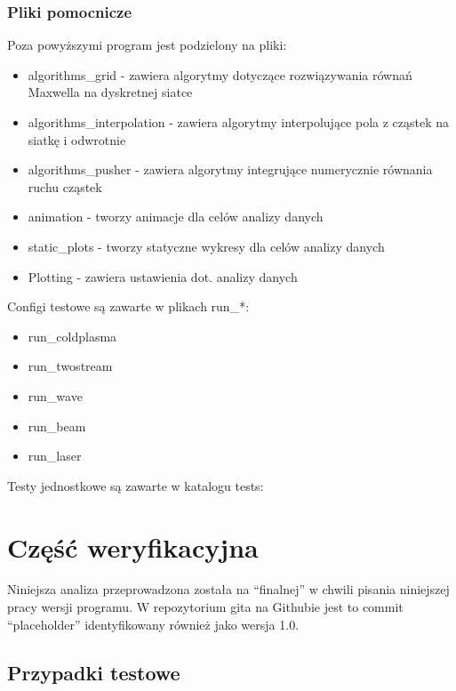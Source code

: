     \subsubsection{Pliki pomocnicze}
    Poza powyższymi program jest podzielony na pliki: 
    \begin{itemize}
        \item algorithms\_grid - zawiera algorytmy dotyczące rozwiązywania równań Maxwella na dyskretnej siatce
        \item algorithms\_interpolation - zawiera algorytmy interpolujące pola z cząstek na siatkę i odwrotnie
        \item algorithms\_pusher - zawiera algorytmy integrujące numerycznie równania ruchu cząstek
        \item animation - tworzy animacje dla celów analizy danych
        \item static\_plots - tworzy statyczne wykresy dla celów analizy danych
        \item Plotting - zawiera ustawienia dot. analizy danych 
    \end{itemize}

    Configi testowe są zawarte w plikach run\_*: 
    \begin{itemize}
        \item run\_coldplasma
        \item run\_twostream
        \item run\_wave
        \item run\_beam
        \item run\_laser
    \end{itemize}

    Testy jednostkowe są zawarte w katalogu tests:



\section[Weryfikacja]{Część weryfikacyjna} %
    Niniejsza analiza przeprowadzona została na ``finalnej'' w chwili pisania niniejszej pracy wersji programu.
    W repozytorium gita na Githubie jest to commit ``placeholder'' 
    identyfikowany również jako wersja 1.0.

    \subsection{Przypadki testowe}

